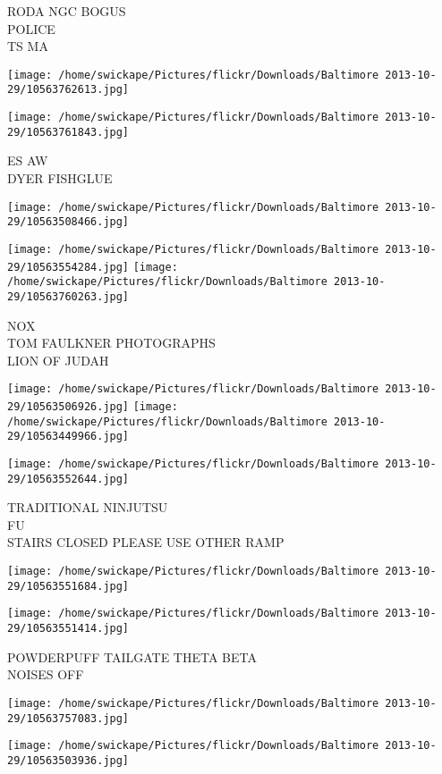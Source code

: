 \documentclass[10pt,letterpaper]{article}
\begin{document}
RODA NGC BOGUS\\
POLICE\\
TS MA
\pagebreak

\texttt{[image: /home/swickape/Pictures/flickr/Downloads/Baltimore 2013-10-29/10563762613.jpg]}

\vspace{0.25in}
\texttt{[image: /home/swickape/Pictures/flickr/Downloads/Baltimore 2013-10-29/10563761843.jpg]}

ES AW\\
DYER FISHGLUE
\pagebreak

\texttt{[image: /home/swickape/Pictures/flickr/Downloads/Baltimore 2013-10-29/10563508466.jpg]}

\vspace{0.25in}
\texttt{[image: /home/swickape/Pictures/flickr/Downloads/Baltimore 2013-10-29/10563554284.jpg]}
\texttt{[image: /home/swickape/Pictures/flickr/Downloads/Baltimore 2013-10-29/10563760263.jpg]}

NOX\\
TOM FAULKNER PHOTOGRAPHS\\
LION OF JUDAH
\pagebreak

\texttt{[image: /home/swickape/Pictures/flickr/Downloads/Baltimore 2013-10-29/10563506926.jpg]}
\texttt{[image: /home/swickape/Pictures/flickr/Downloads/Baltimore 2013-10-29/10563449966.jpg]}

\texttt{[image: /home/swickape/Pictures/flickr/Downloads/Baltimore 2013-10-29/10563552644.jpg]}

TRADITIONAL NINJUTSU\\
FU\\
STAIRS CLOSED PLEASE USE OTHER RAMP
\pagebreak

\texttt{[image: /home/swickape/Pictures/flickr/Downloads/Baltimore 2013-10-29/10563551684.jpg]}

\vspace{0.25in}
\texttt{[image: /home/swickape/Pictures/flickr/Downloads/Baltimore 2013-10-29/10563551414.jpg]}

POWDERPUFF TAILGATE THETA BETA\\
NOISES OFF
\pagebreak

\texttt{[image: /home/swickape/Pictures/flickr/Downloads/Baltimore 2013-10-29/10563757083.jpg]}

\vspace{0.25in}
\texttt{[image: /home/swickape/Pictures/flickr/Downloads/Baltimore 2013-10-29/10563503936.jpg]}
\end{document}
